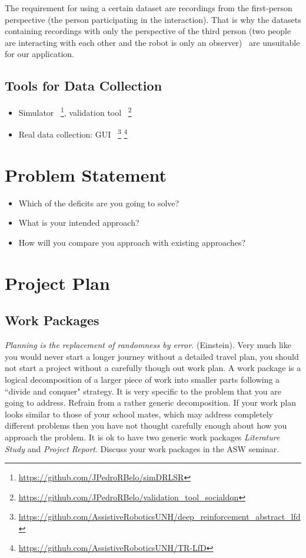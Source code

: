 \documentclass[thesis]{mas_proposal}
\begin{document}
The requirement for using a certain dataset are recordings from the first-person perspective (the person participating in the interaction). That is why the datasets containing recordings with only the perspective of the third person (two people are interacting with each other and the robot is only an observer)~\cite{Hu2013,UT-Interaction-Data,Gemeren2016,Yun2012} are unsuitable for our application.

\subsection{Tools for Data Collection}
\begin{itemize}
\item Simulator~\cite{Belo2021} \footnote{\url{https://github.com/JPedroRBelo/simDRLSR}}, validation tool~\cite{Belo2022} \footnote{\url{https://github.com/JPedroRBelo/validation_tool_socialdqn}}

\item Real data collection:  GUI~\cite{Turner2018} \footnote{\url{https://github.com/AssistiveRoboticsUNH/deep_reinforcement_abstract_lfd}} \cite{carpio2018learning,carpio2019learning} \footnote{\url{https://github.com/AssistiveRoboticsUNH/TR-LfD}}
\end{itemize}

\section{Problem Statement}
\begin{itemize}
    \item Which of the deficits are you going to solve?
    \item What is your intended approach?
    \item How will you compare you approach with existing approaches?
\end{itemize}

\section{Project Plan}

\subsection{Work Packages}
\emph{Planning is the replacement of randomness by error.} (Einstein). Very much like you would never start a longer journey without a detailed travel plan, you should not start a project without a carefully though out work plan. A work package is a logical decomposition of a larger piece of work into smaller parts following a ``divide and conquer" strategy. It is very specific to the problem that you are going to address. Refrain from a rather generic decomposition. If your work plan looks similar to those of your school mates, which may address completely different problems then you have not thought carefully enough about how you approach the problem. It is ok to have two generic work packages \emph{Literature Study} and \emph{Project Report}. Discuss your work packages in the ASW seminar.
\end{document}

